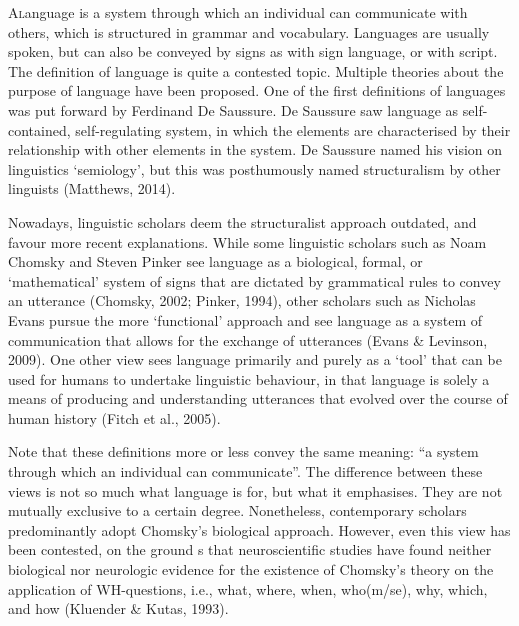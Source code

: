 \def\isy#1{\scalerel*{\texttt{[image: ./Images/\#1.jpg]}}{X}}


\lettrine{A} language is a system through which an individual can communicate with others, which is structured in grammar and vocabulary. Languages are usually spoken, but can also be conveyed by signs as with sign language, or with script. The definition of language is quite a contested topic. Multiple theories about the purpose of language have been proposed. One of the first definitions of languages was put forward by Ferdinand De Saussure. De Saussure saw language as self-contained, self-regulating system, in which the elements are characterised by their relationship with other elements in the system. De Saussure named his vision on linguistics ‘semiology’, but this was posthumously named structuralism by other linguists (Matthews, 2014). 

Nowadays, linguistic scholars deem the structuralist approach outdated, and favour more recent explanations. While some linguistic scholars such as Noam Chomsky and Steven Pinker see language as a biological, formal, or ‘mathematical’ system of signs that are dictated by grammatical rules to convey an utterance (Chomsky, 2002; Pinker, 1994), other scholars such as Nicholas Evans pursue the more ‘functional’ approach and see language as a system of communication that allows for the exchange of utterances (Evans \& Levinson, 2009). One other view sees language primarily and purely as a ‘tool’ that can be used for humans to undertake linguistic behaviour, in that language is solely a means of producing and understanding utterances that evolved over the course of human history (Fitch et al., 2005). 

Note that these definitions more or less convey the same meaning: “a system through which an individual can communicate”. The difference between these views is not so much what language is for, but what it emphasises. They are not mutually exclusive to a certain degree. Nonetheless, contemporary scholars predominantly adopt Chomsky's biological approach. However, even this view has been contested, on the ground s that neuroscientific studies have found  neither biological nor neurologic evidence for the existence of Chomsky’s theory on the application of WH-questions, i.e., what, where, when, who(m/se), why, which, and how (Kluender \& Kutas, 1993). 

